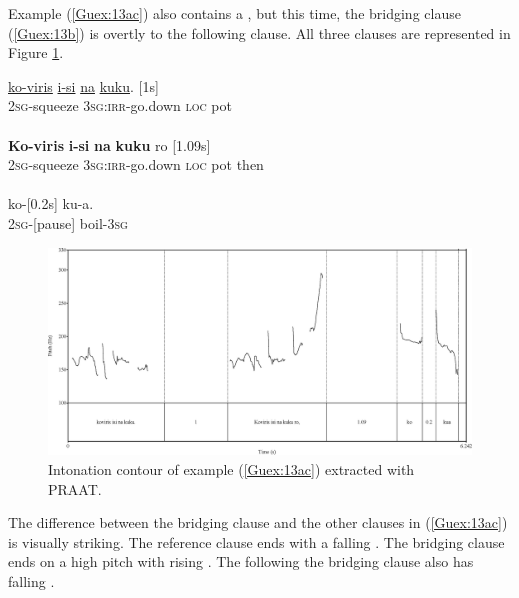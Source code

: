 \documentclass[output=paper]{LSP/langsci}
\begin{document}
Example (\ref{Guex:13ac}) also contains a , but this time, the bridging clause (\ref{Guex:13b}) is overtly  to the following clause. All three clauses are represented in Figure \ref{GuF3}. 

\begin{exe}
\ex \label{Guex:13ac}
\begin{xlist}
\ex \label{Guex:13a}
\gll \underline{ko-viris}          \underline{i-si}                 \underline{na}     \underline{kuku}. [1s]\\
\textsc{2sg}-squeeze     \textsc{3sg:irr-}go.down   \textsc{loc}    pot \\
\glt {}\\
\ex \label{Guex:13b}
\gll \textbf{Ko-viris}          \textbf{i-si}               \textbf{na}    \textbf{kuku}   ro [1.09s] \\
\textsc{2sg}-squeeze     \textsc{3sg:irr-}go.down   \textsc{loc}    pot then\\
\glt {}\\
\ex \label{Guex:13c}
\gll   ko-[0.2s] ku-a.\\     	       
\textsc{2sg}-[pause] boil-\textsc{3sg}\\
\glt {} 
\end{xlist}
\end{exe}

\begin{figure}[ht]
\includegraphics[width=\textwidth]{figures/guerinFig3x.eps}
\caption{Intonation contour of example (\ref{Guex:13ac}) extracted with PRAAT. \label{GuF3}}
\end{figure}

The difference between the bridging clause and the other clauses in (\ref{Guex:13ac}) is visually striking. The reference clause ends with a falling . The bridging clause ends on a high pitch with rising . The  following the bridging clause also has falling . 
\end{document}
